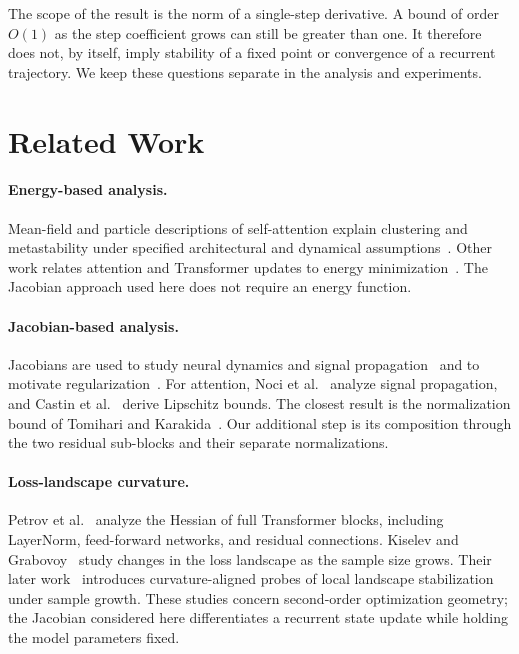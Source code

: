 \documentclass[11pt]{article}
\numberwithin{equation}{section}
\begin{document}
The scope of the result is the norm of a single-step derivative. A bound of order
$O(1)$ as the step coefficient grows can still be greater than one. It therefore
does not, by itself, imply stability of a fixed point or convergence of a
recurrent trajectory. We keep these questions separate in the analysis and
experiments.

\section{Related Work}
\paragraph{Energy-based analysis.}
Mean-field and particle descriptions of self-attention explain clustering and
metastability under specified architectural and dynamical
assumptions~\cite{geshkovski2023clusters,geshkovski2025perspective,
geshkovski2024metastability,bruno2025clustering,karagodin2024causal}.
Other work relates attention and Transformer updates to energy
minimization~\cite{ramsauer2021hopfield,yang2022optimization,hoover2023energy}.
The Jacobian approach used here does not require an energy function.

\paragraph{Jacobian-based analysis.}
Jacobians are used to study neural dynamics and signal
propagation~\cite{boedecker2012information,poole2016expressivity,
pennington2017isometry,haber2017stable,chang2019antisymmetric} and to motivate
regularization~\cite{yoshida2017spectral,lewandowski2025continually}.
For attention, Noci et al.~\cite{noci2022signal} analyze signal propagation, and
Castin et al.~\cite{castin2024smooth} derive Lipschitz bounds.
The closest result is the normalization bound of Tomihari and
Karakida~\cite{tomihari2025recurrent}. Our additional step is its composition
through the two residual sub-blocks and their separate normalizations.

\paragraph{Loss-landscape curvature.}
Petrov et al.~\cite{petrov2025closing} analyze the Hessian of full Transformer
blocks, including LayerNorm, feed-forward networks, and residual connections.
Kiselev and Grabovoy~\cite{kiselev2024unraveling} study changes in the loss
landscape as the sample size grows. Their later
work~\cite{kiselev2026curvature} introduces curvature-aligned probes of local
landscape stabilization under sample growth. These studies concern second-order
optimization geometry; the Jacobian considered here differentiates a recurrent
state update while holding the model parameters fixed.
\end{document}
